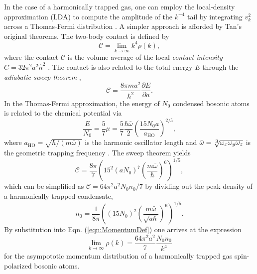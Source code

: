 	In the case of a harmonically trapped gas, one can employ the local-density approximation (LDA) to compute the amplitude of the $k^{-4}$ tail by  integrating $v_k^2$ across a Thomas-Fermi distribution \cite{Chang16}. A simpler approach is afforded by Tan's original theorems. The two-body contact is defined by \cite{Tan08_momentum,Braaten11}
	\begin{equation}
		\mathcal{C} = \lim_{k\rightarrow\infty}k^4\rho(k),
		\label{eqn:MomentumDef}
	\end{equation}
	where the contact $\mathcal{C}$ is the volume average of the local \emph{contact intensity} $\hat{C} = 32 \pi^2 a^2 \hat{n}^2$ \cite{Werner12_boson}. The contact is also related to the total energy $E$ through the \emph{adiabatic sweep theorem} \cite{Tan08_energetics},
	\begin{equation}
		\mathcal{C} = \frac{8\pi m a^2}{\hbar^2}\frac{\partial E}{\partial a}.
	\end{equation}
	In the Thomas-Fermi approximation, the energy of $N_0$ condensed bosonic atoms is related to the chemical potential via
	\begin{equation}
		\frac{E}{N_0} = \frac{5}{7}\mu = \frac{5}{7} \frac{\hbar \bar{\omega}}{2} \left(\frac{15 N_0 a}{a_\textrm{HO}}\right)^{2/5},
		\label{mu}
	\end{equation}
	where $a_\textrm{HO} = \sqrt{\hbar/(m \bar{\omega})}$ is the harmonic oscillator length and $\bar{\omega}=\sqrt[\uproot{2}\scriptstyle 3]{\omega_x \omega_y \omega_z}$ is the geometric trapping frequency \cite{PitaevskiiStringari,PethickSmith}. The sweep theorem yields
	\begin{equation}
		\mathcal{C} = \frac{8\pi}{7} \left(15^{2}(a N_0)^{7} \left(\frac{m \bar{\omega}}{\hbar}\right)^{6}\right)^{1/5},
		\label{eqn:TotalHarmonicContact}
	\end{equation}
	which can be simplified as $\mathcal{C} = 64\pi^2a^2 N_0 n_0/7$ by dividing out the peak density of a harmonically trapped condensate,
	\begin{equation}
		n_0 = \frac{1}{8 \pi}\left( (15N_0)^2 \left(\frac{m \bar{\omega}}{\sqrt{a \hbar}}\right)	 ^{6}\right)^{1/5}.
		\label{eqn:n0}
	\end{equation}
	By substitution into Eqn. (\ref{eqn:MomentumDef}) one arrives at the expression
	\begin{equation}
		\lim_{k\rightarrow\infty}\rho(k) = \frac{64\pi^2a^2}{7} \frac{N_0n_0}{k^4}
		\label{eqn:pred_scaling}
	\end{equation}
	for the asympototic momentum distribution of a harmonically trapped gas spin-polarized bosonic atoms. 

